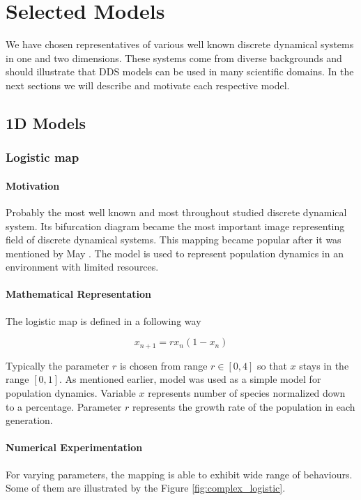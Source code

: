 \chapter{Selected Models}
We have chosen representatives of various well known discrete dynamical systems in one and two dimensions. These systems come from diverse backgrounds and should illustrate that DDS models can be used in many scientific domains. In the next sections we will describe and motivate each respective model.

\section{1D Models}

\subsection{Logistic map}
\label{subsec:logistic map}

\subsubsection{Motivation}
Probably the most well known and most throughout studied discrete dynamical system.
Its bifurcation diagram became the most important image representing field of discrete dynamical systems.
This mapping became popular after it was mentioned by May \cite{May19760610}.
The model is used to represent population dynamics in an environment with limited resources.

\subsubsection{Mathematical Representation}
The logistic map is defined in a following way

\begin{equation}
    x_{n+1} = r x_{n} ( 1 - x_{n} )
\end{equation}

Typically the parameter $r$ is chosen from range $r \in [0, 4]$ so that $x$ stays in the range $[0,1]$.
As mentioned earlier, model was used as a simple model for population dynamics.
Variable $x$ represents number of species normalized down to a percentage.
Parameter $r$ represents the growth rate of the population in each generation.

\subsubsection{Numerical Experimentation}
For varying parameters, the mapping is able to exhibit wide range of behaviours.
Some of them are illustrated by the Figure \ref{fig:complex_logistic}.

